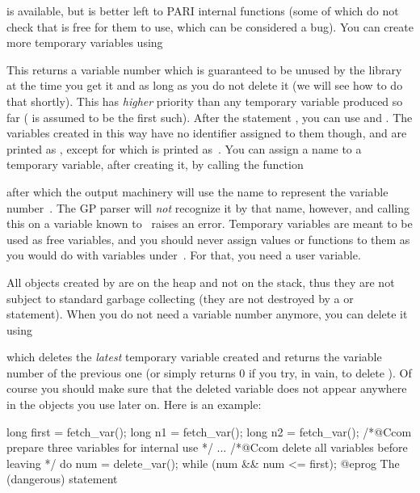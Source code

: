  is available, but is better left to PARI internal functions
(some of which do not check that  is free for them to use,
which can be considered a bug). You can create more temporary variables
using

\label{se:fetch_var}

\noindent
This returns a variable number which is guaranteed to be unused by the
library at the time you get it and as long as you do not delete it (we will
see how to do that shortly). This has \emph{higher} priority than any
temporary variable produced so far ( is assumed to be the first
such). After the statement , you can use
 and . The variables created in this way have no
identifier assigned to them though, and are printed as
, except for  which is printed
as~\kbd{\#}. You can assign a name to a temporary variable, after creating
it, by calling the function


\noindent after which the output machinery will use the name  to
represent the variable number~. The GP parser will \emph{not}
recognize it by that name, however, and calling this on a variable known
to~ raises an error. Temporary variables are meant to be used as free
variables, and you should never assign values or functions to them as you
would do with variables under~. For that, you need a user variable.

All objects created by  are on the heap and not on the stack,
thus they are not subject to standard garbage collecting (they are not
destroyed by a  or  statement). When you do
not need a variable number anymore, you can delete it using


\noindent which deletes the \emph{latest} temporary variable created and
returns the variable number of the previous one (or simply returns 0 if you
try, in vain, to delete ). Of course you should make sure that
the deleted variable does not appear anywhere in the objects you use later
on. Here is an example:

\bprog
  long first = fetch_var();
  long n1 = fetch_var();
  long n2 = fetch_var(); /*@Ccom prepare three variables for internal use */
  ...
  /*@Ccom delete all variables before leaving */
  do { num = delete_var(); } while (num && num <= first);
@eprog\noindent
The (dangerous) statement


